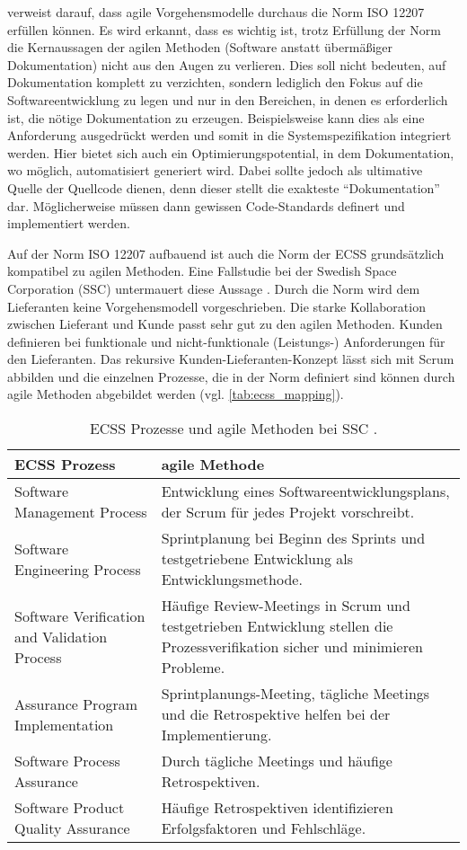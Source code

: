 \parencite[][]{Theunissen:2003:SAS:954014.954034} verweist darauf, dass agile Vorgehensmodelle durchaus die Norm ISO 12207 erfüllen können.
Es wird erkannt, dass es wichtig ist, trotz Erfüllung der Norm die Kernaussagen der agilen Methoden (Software anstatt übermäßiger Dokumentation) nicht aus den Augen zu verlieren.
Dies soll nicht bedeuten, auf Dokumentation komplett zu verzichten, sondern lediglich den Fokus auf die Softwareentwicklung zu legen und nur in den Bereichen, in denen es erforderlich ist, die nötige Dokumentation zu erzeugen.
Beispielsweise kann dies als eine Anforderung ausgedrückt werden und somit in die Systemspezifikation integriert werden.
Hier bietet sich auch ein Optimierungspotential, in dem Dokumentation, wo möglich, automatisiert generiert wird.
Dabei sollte jedoch als ultimative Quelle der Quellcode dienen, denn dieser stellt die exakteste \enquote{Dokumentation} dar.
Möglicherweise müssen dann gewissen Code-Standards definert und implementiert werden.

Auf der Norm ISO 12207 aufbauend ist auch die Norm der ECSS grundsätzlich kompatibel zu agilen Methoden.
Eine Fallstudie bei der Swedish Space Corporation (SSC) untermauert diese Aussage \parencite[Vgl.][S. 1]{Ahmad:2010:ESC:1890810.1890816}.
Durch die Norm wird dem Lieferanten keine Vorgehensmodell vorgeschrieben.
Die starke Kollaboration zwischen Lieferant und Kunde passt sehr gut zu den agilen Methoden.
Kunden definieren bei funktionale und nicht-funktionale (Leistungs-) Anforderungen für den Lieferanten.
Das rekursive Kunden-Lieferanten-Konzept lässt sich mit Scrum abbilden und die einzelnen Prozesse, die in der Norm definiert sind können durch agile Methoden abgebildet werden (vgl. \autoref{tab:ecss_mapping}).

\begin{table}[h]
\center
\caption{ECSS Prozesse und agile Methoden bei SSC \parencite[in Anlehnung an][S. 5]{Ahmad:2010:ESC:1890810.1890816}.}
\label{tab:ecss_mapping}
\begin{tabularx}{\textwidth}{p{6cm}|X}
ECSS Prozess & agile Methode\\
\hline
\hline
Software Management Process & Entwicklung eines Softwareentwicklungsplans, der Scrum für jedes Projekt vorschreibt.\\
\hline
Software Engineering Process & Sprintplanung bei Beginn des Sprints und testgetriebene Entwicklung als Entwicklungsmethode.\\
\hline
Software Verification and Validation Process & Häufige Review-Meetings in Scrum und testgetrieben Entwicklung stellen die Prozessverifikation sicher und minimieren Probleme.\\
\hline
Assurance Program Implementation & Sprintplanungs-Meeting, tägliche Meetings und die Retrospektive helfen bei der Implementierung.\\
\hline
Software Process Assurance & Durch tägliche Meetings und häufige Retrospektiven.\\
\hline
Software Product Quality Assurance & Häufige Retrospektiven identifizieren Erfolgsfaktoren und Fehlschläge.\\
\end{tabularx}
\end{table}

